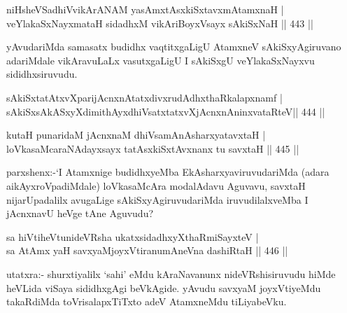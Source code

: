 
\begin{shl}
niHsheVSadhiVvikArANAM yasAmxtAsxkiSxtavxmAtamxnaH | \\
veYlakaSxNayxmataH sidadhxM vikAriBoyxV\s sayx sAkiSxNaH \hfill||  443 || 
\end{shl}

\begin{artha}
yAvudariMda samasatx budidhx vaqtitxgaLigU AtamxneV sAkiSxyAgiruvano adariMdale vikAravuLaLx vasutxgaLigU I sAkiSxgU veYlakaSxNayxvu sididhxsiruvudu.
\end{artha}


\begin{shl}
sAkiSxtatAtxvXparijAcnxnAtatxdivxrudAdhxthaRkalapxnamf | \\
sAkiSxsAkASxyXdimithAyxdhiVsatxtatxvXjAcnxnAninxvataRteV\hfill ||  444 || 
\end{shl}

\begin{shl}
kutaH punaridaM jAcnxnaM dhiVsamAnAsharxyatavxtaH | \\
loVkasaMcaraNAdayxsayx tatAsxkiSxtAvxnanx tu savxtaH \hfill||  445 ||  
\end{shl}

\begin{artha}
parxshenx:-`I Atamxnige budidhxyeMba EkAsharxyaviruvudariMda (adara aikAyxroVpadiMdale) loVkasaMcAra modalAdavu Aguvavu, savxtaH nijarUpadalilx avugaLige sAkiSxyAgiruvudariMda iruvudilalxveMba I jAcnxnavU heVge tAne Aguvudu?
\end{artha}

\begin{shl}
sa hiVtiheVtunideVRsha ukatxsidadhxyXthaRmiSayxteV | \\
sa AtAmx yaH savxyaMjoyxVtiranumAneVna dashiRtaH \hfill||  446 ||  
\end{shl}

\begin{artha}
utatxra:- shurxtiyalilx `sahi' eMdu kAraNavanunx nideVRshisiruvudu hiMde heVLida viSaya sididhxgAgi beVkAgide. yAvudu savxyaM joyxVtiyeMdu takaRdiMda toVrisalapxTiTxto adeV AtamxneMdu tiLiyabeVku.
\end{artha}


